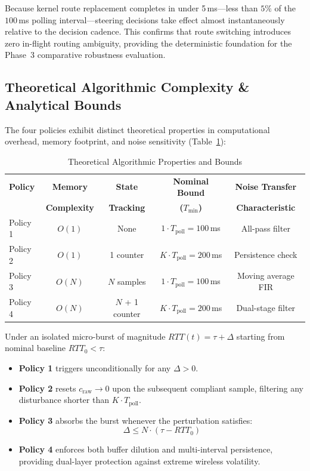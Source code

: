 Because kernel route replacement completes in under 5\,ms---less than $5\%$ of the $100$\,ms polling interval---steering decisions take effect almost instantaneously relative to the decision cadence. This confirms that route switching introduces zero in-flight routing ambiguity, providing the deterministic foundation for the Phase~3 comparative robustness evaluation.

\subsection{Theoretical Algorithmic Complexity \& Analytical Bounds}
\label{subsec:theoretical_bounds}

The four policies exhibit distinct theoretical properties in computational overhead, memory footprint, and noise sensitivity (Table~\ref{tab:theoretical_bounds}):

\begin{table}[htbp]
\caption{Theoretical Algorithmic Properties and Bounds}
\label{tab:theoretical_bounds}
\centering
\begin{tabular}{lcccc}
\toprule
\textbf{Policy} & \textbf{Memory} & \textbf{State} & \textbf{Nominal Bound} & \textbf{Noise Transfer} \\
& \textbf{Complexity} & \textbf{Tracking} & \textbf{($T_{\text{min}}$)} & \textbf{Characteristic} \\
\midrule
Policy 1 & $O(1)$ & None & $1 \cdot T_{\text{poll}} = 100$\,ms & All-pass filter \\
Policy 2 & $O(1)$ & 1 counter & $K \cdot T_{\text{poll}} = 200$\,ms & Persistence check \\
Policy 3 & $O(N)$ & $N$ samples & $1 \cdot T_{\text{poll}} = 100$\,ms & Moving average FIR \\
Policy 4 & $O(N)$ & $N$ + 1 counter & $K \cdot T_{\text{poll}} = 200$\,ms & Dual-stage filter \\
\bottomrule
\end{tabular}
\end{table}

Under an isolated micro-burst of magnitude $RTT(t) = \tau + \Delta$ starting from nominal baseline $RTT_0 < \tau$:
\begin{itemize}
    \item \textbf{Policy 1} triggers unconditionally for any $\Delta > 0$.
    \item \textbf{Policy 2} resets $c_{\text{raw}} \to 0$ upon the subsequent compliant sample, filtering any disturbance shorter than $K \cdot T_{\text{poll}}$.
    \item \textbf{Policy 3} absorbs the burst whenever the perturbation satisfies:
    \begin{equation}
    \Delta \le N \cdot (\tau - RTT_0)
    \end{equation}
    \item \textbf{Policy 4} enforces both buffer dilution and multi-interval persistence, providing dual-layer protection against extreme wireless volatility.
\end{itemize}


